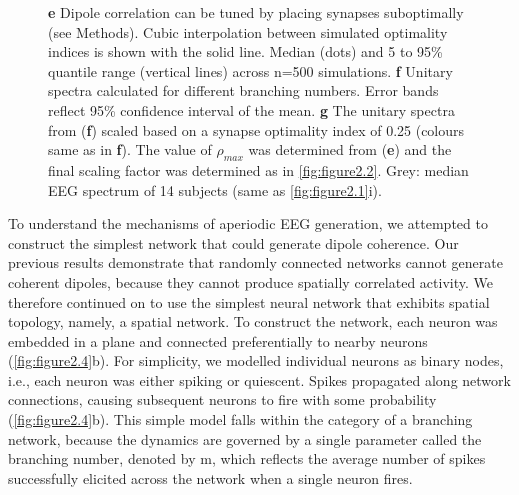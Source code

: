 \begin{figure}[t!]
{\begin{minipage}[c]{180mm}
{	\textbf{e} Dipole correlation can be tuned by placing synapses suboptimally (see Methods). Cubic interpolation between simulated optimality indices is shown with the solid line. Median (dots) and 5 to 95\% quantile range (vertical lines) across n=500 simulations.
	\textbf{f} Unitary spectra calculated for different branching numbers. Error bands reflect 95\% confidence interval of the mean.
	\textbf{g} The unitary spectra from (\textbf{f}) scaled based on a synapse optimality index of 0.25 (colours same as in \textbf{f}). The value of $\rho_{max}$ was determined from (\textbf{e}) and the final scaling factor was determined as in \autoref{fig:figure2.2}. Grey: median EEG spectrum of 14 subjects (same as \autoref{fig:figure2.1}i).} 
    \label{fig:figure2.4}
    \end{minipage}
    }
\end{figure}


To understand the mechanisms of aperiodic EEG generation, we attempted to construct the simplest network that could generate dipole coherence. Our previous results demonstrate that randomly connected networks cannot generate coherent dipoles, because they cannot produce spatially correlated activity. We therefore continued on to use the simplest neural network that exhibits spatial topology, namely, a spatial network. To construct the network, each neuron was embedded in a plane and connected preferentially to nearby neurons (\autoref{fig:figure2.4}b). For simplicity, we modelled individual neurons as binary nodes, i.e., each neuron was either spiking or quiescent. Spikes propagated along network connections, causing subsequent neurons to fire with some probability (\autoref{fig:figure2.4}b). This simple model falls within the category of a branching network, because the dynamics are governed by a single parameter called the branching number, denoted by m, which reflects the average number of spikes successfully elicited across the network when a single neuron fires. 

